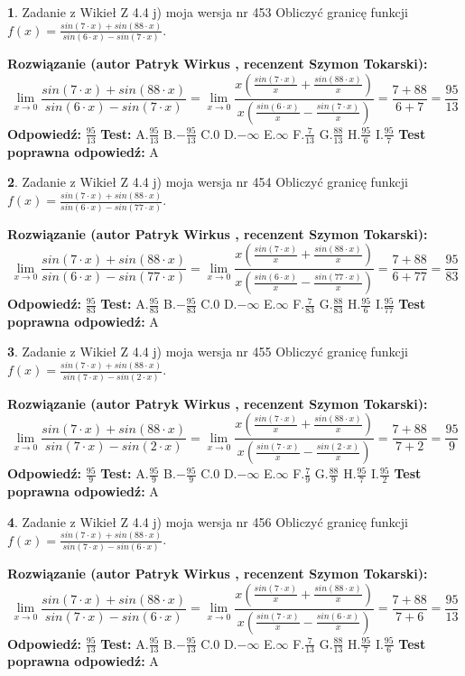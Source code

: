 \documentclass[12pt, a4paper]{article}
\theoremstyle{definition} %
\newtheorem{zad}{}
\newcommand{\zadStart}[1]{\begin{zad}#1\newline}
\newcommand{\zadStop}{\end{zad}}
\newcommand{\rozwStart}[2]{\noindent \textbf{Rozwiązanie (autor #1 , recenzent #2): }\newline}
\newcommand{\rozwStop}{\newline}
\newcommand{\odpStart}{\noindent \textbf{Odpowiedź:}\newline}
\newcommand{\odpStop}{\newline}
\newcommand{\testStart}{\noindent \textbf{Test:}\newline}
\newcommand{\testStop}{\newline}
\newcommand{\kluczStart}{\noindent \textbf{Test poprawna odpowiedź:}\newline}
\newcommand{\kluczStop}{\newline}
\begin{document}
\zadStart{Zadanie z Wikieł Z 4.4 j) moja wersja nr 453}
Obliczyć granicę funkcji $f(x)=\frac{sin(7\cdot x) +sin(88\cdot x)}{sin(6\cdot x) -sin(7\cdot x)}$.
\zadStop
\rozwStart{Patryk Wirkus}{Szymon Tokarski}
$$\lim\limits_{x\to 0}\frac{sin(7\cdot x) +sin(88\cdot x)}{sin(6\cdot x) -sin(7\cdot x)}=\lim\limits_{x\to 0}\frac{x(\frac{sin(7\cdot x)}{x}+\frac{sin(88\cdot x)}{x})}{x(\frac{sin(6\cdot x)}{x}-\frac{sin(7\cdot x)}{x})}=\frac{7+88}{6+7} = \frac{95}{13}$$
\rozwStop
\odpStart
$\frac{95}{13}$
\odpStop
\testStart
A.$\frac{95}{13}$
B.$-\frac{95}{13}$
C.$0$
D.$-\infty$
E.$\infty$
F.$\frac{7}{13}$
G.$\frac{88}{13}$
H.$\frac{95}{6}$
I.$\frac{95}{7}$
\testStop
\kluczStart
A
\kluczStop



\zadStart{Zadanie z Wikieł Z 4.4 j) moja wersja nr 454}
Obliczyć granicę funkcji $f(x)=\frac{sin(7\cdot x) +sin(88\cdot x)}{sin(6\cdot x) -sin(77\cdot x)}$.
\zadStop
\rozwStart{Patryk Wirkus}{Szymon Tokarski}
$$\lim\limits_{x\to 0}\frac{sin(7\cdot x) +sin(88\cdot x)}{sin(6\cdot x) -sin(77\cdot x)}=\lim\limits_{x\to 0}\frac{x(\frac{sin(7\cdot x)}{x}+\frac{sin(88\cdot x)}{x})}{x(\frac{sin(6\cdot x)}{x}-\frac{sin(77\cdot x)}{x})}=\frac{7+88}{6+77} = \frac{95}{83}$$
\rozwStop
\odpStart
$\frac{95}{83}$
\odpStop
\testStart
A.$\frac{95}{83}$
B.$-\frac{95}{83}$
C.$0$
D.$-\infty$
E.$\infty$
F.$\frac{7}{83}$
G.$\frac{88}{83}$
H.$\frac{95}{6}$
I.$\frac{95}{77}$
\testStop
\kluczStart
A
\kluczStop



\zadStart{Zadanie z Wikieł Z 4.4 j) moja wersja nr 455}
Obliczyć granicę funkcji $f(x)=\frac{sin(7\cdot x) +sin(88\cdot x)}{sin(7\cdot x) -sin(2\cdot x)}$.
\zadStop
\rozwStart{Patryk Wirkus}{Szymon Tokarski}
$$\lim\limits_{x\to 0}\frac{sin(7\cdot x) +sin(88\cdot x)}{sin(7\cdot x) -sin(2\cdot x)}=\lim\limits_{x\to 0}\frac{x(\frac{sin(7\cdot x)}{x}+\frac{sin(88\cdot x)}{x})}{x(\frac{sin(7\cdot x)}{x}-\frac{sin(2\cdot x)}{x})}=\frac{7+88}{7+2} = \frac{95}{9}$$
\rozwStop
\odpStart
$\frac{95}{9}$
\odpStop
\testStart
A.$\frac{95}{9}$
B.$-\frac{95}{9}$
C.$0$
D.$-\infty$
E.$\infty$
F.$\frac{7}{9}$
G.$\frac{88}{9}$
H.$\frac{95}{7}$
I.$\frac{95}{2}$
\testStop
\kluczStart
A
\kluczStop



\zadStart{Zadanie z Wikieł Z 4.4 j) moja wersja nr 456}
Obliczyć granicę funkcji $f(x)=\frac{sin(7\cdot x) +sin(88\cdot x)}{sin(7\cdot x) -sin(6\cdot x)}$.
\zadStop
\rozwStart{Patryk Wirkus}{Szymon Tokarski}
$$\lim\limits_{x\to 0}\frac{sin(7\cdot x) +sin(88\cdot x)}{sin(7\cdot x) -sin(6\cdot x)}=\lim\limits_{x\to 0}\frac{x(\frac{sin(7\cdot x)}{x}+\frac{sin(88\cdot x)}{x})}{x(\frac{sin(7\cdot x)}{x}-\frac{sin(6\cdot x)}{x})}=\frac{7+88}{7+6} = \frac{95}{13}$$
\rozwStop
\odpStart
$\frac{95}{13}$
\odpStop
\testStart
A.$\frac{95}{13}$
B.$-\frac{95}{13}$
C.$0$
D.$-\infty$
E.$\infty$
F.$\frac{7}{13}$
G.$\frac{88}{13}$
H.$\frac{95}{7}$
I.$\frac{95}{6}$
\testStop
\kluczStart
A
\kluczStop
\end{document}
